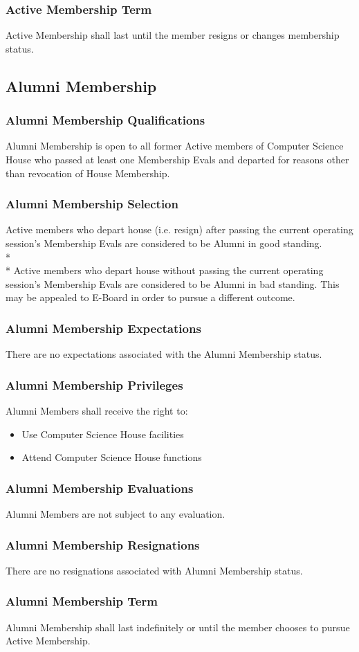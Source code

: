 \documentclass{article}
\newcommand{\asection}[1]{\subsection{#1} \label{#1}}
\newcommand{\asubsection}[1]{\subsubsection{#1} \label{#1}}
\begin{document}
\asubsection{Active Membership Term}
Active Membership shall last until the member resigns or changes membership status.

\asection{Alumni Membership}

\asubsection{Alumni Membership Qualifications}
Alumni Membership is open to all former Active members of Computer Science House who passed at least one Membership Evals and departed for reasons other than revocation of House Membership.

\asubsection{Alumni Membership Selection}
Active members who depart house (i.e. resign) after passing the current operating session's Membership Evals are considered to be Alumni in good standing.
\\*\\*
Active members who depart house without passing the current operating session's Membership Evals are considered to be Alumni in bad standing.
This may be appealed to E-Board in order to pursue a different outcome.

\asubsection{Alumni Membership Expectations}
There are no expectations associated with the Alumni Membership status.

\asubsection{Alumni Membership Privileges}
Alumni Members shall receive the right to:
\begin{itemize}
	\item Use Computer Science House facilities
	\item Attend Computer Science House functions
\end{itemize}

\asubsection{Alumni Membership Evaluations}
Alumni Members are not subject to any evaluation.

\asubsection{Alumni Membership Resignations}
There are no resignations associated with Alumni Membership status.

\asubsection{Alumni Membership Term}
Alumni Membership shall last indefinitely or until the member chooses to pursue Active Membership.
\end{document}
